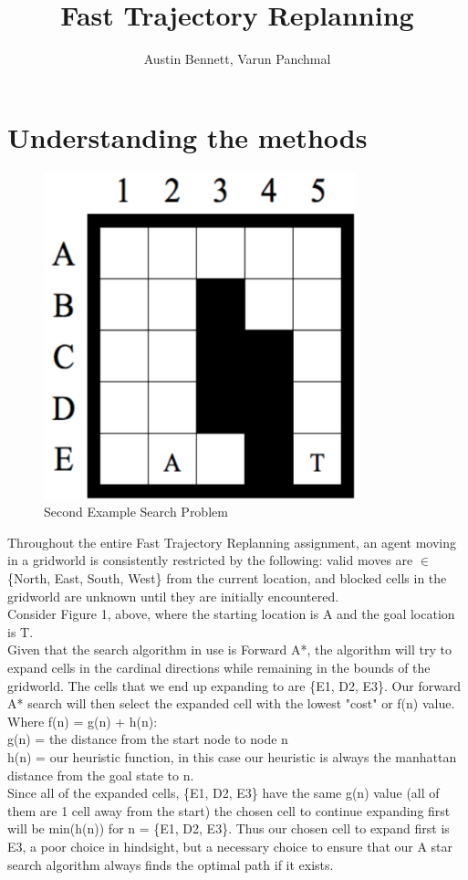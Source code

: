 \documentclass[12pt]{article}
\begin{document}
\title{Fast Trajectory Replanning}
\author{Austin Bennett, Varun Panchmal}
\maketitle

\section*{Understanding the methods}
	\begin{figure}[!htb]
		\centering
		\includegraphics[width=.5\textwidth]{figure_8.png}
		\caption{\label{: }Second Example Search Problem}
	\end{figure}
Throughout the entire Fast Trajectory Replanning assignment, an agent moving in a gridworld is consistently restricted by the following: valid moves are $\in$ \{North, East, South, West\} from the current location, and blocked cells in the gridworld are unknown until they are initially encountered. \\
Consider Figure 1, above, where the starting location is A and the goal location is T. \\
Given that the search algorithm in use is Forward A*, the algorithm will try to expand cells in the cardinal directions while remaining in the bounds of the gridworld. The cells that we end up expanding to are \{E1, D2, E3\}. Our forward A* search will then select the expanded cell with the lowest "cost" or f(n) value.\\
Where f(n) = g(n) + h(n): \\
g(n) = the distance from the start node to node n \\
h(n) = our heuristic function, in this case our heuristic is always the manhattan distance from the goal state to n. \\
Since all of the expanded cells, \{E1, D2, E3\} have the same g(n) value (all of them are 1 cell away from the start) the chosen cell to continue expanding first will be min(h(n)) for n = \{E1, D2, E3\}. Thus our chosen cell to expand first is E3, a poor choice in hindsight, but a necessary choice to ensure that our A star search algorithm always finds the optimal path if it exists. \\ \\
\end{document}
